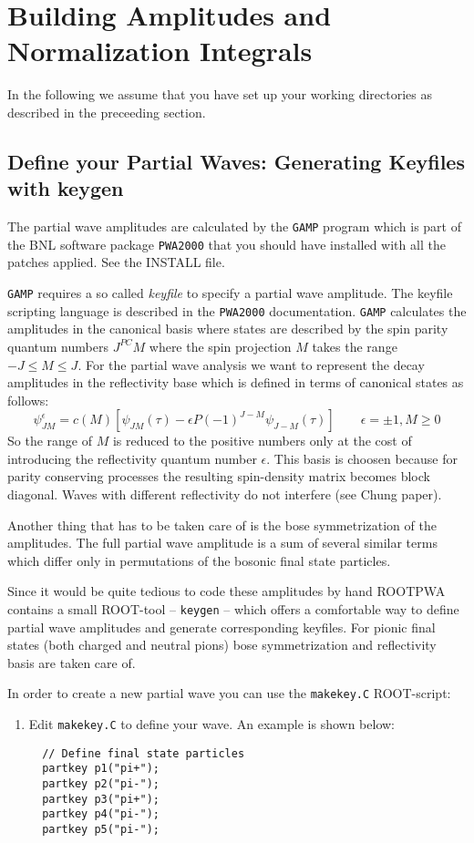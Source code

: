 \documentclass[12pt,a4paper]{article}
\begin{document}
{\section{Building Amplitudes and Normalization Integrals}
In the following we assume that you have set up your working directories as described in the preceeding section.

\subsection{Define your Partial Waves: Generating Keyfiles with keygen}
The partial wave amplitudes are calculated by the {\tt GAMP} program which is part of the BNL software package {\tt PWA2000} that you should have installed with all the patches applied. See the INSTALL file.

{\tt GAMP} requires a so called {\it keyfile} to specify a partial wave amplitude. The keyfile scripting language is described in the {\tt PWA2000} documentation. {\tt GAMP} calculates the amplitudes in the canonical basis where states are described by the spin parity quantum numbers $J^{PC}M$ where the spin projection $M$ takes the range $-J \leq M \leq J$. For the partial wave analysis we want to represent the decay amplitudes in the reflectivity base which is defined in terms of canonical states as follows:
\[\psi_{JM}^\epsilon = c(M)[\psi_{JM}(\tau)-\epsilon P(-1)^{J-M}\psi_{J-M}(\tau)]\quad\quad \epsilon=\pm1, M\geq0\]
So the range of $M$ is reduced to the positive numbers only at the cost of introducing the reflectivity quantum number $\epsilon$. This basis is choosen because for parity conserving processes the resulting spin-density matrix becomes block diagonal. Waves with different reflectivity do not interfere (see Chung paper).

Another thing that has to be taken care of is the bose symmetrization of the amplitudes. The full partial wave amplitude is a sum of several similar terms which differ only in permutations of the bosonic final state particles.

Since it would be quite tedious to code these amplitudes by hand ROOTPWA contains a small ROOT-tool -- {\tt keygen} -- which offers a comfortable way to define partial wave amplitudes and generate corresponding keyfiles. For pionic final states (both charged and neutral pions) bose symmetrization and reflectivity basis are taken care of.

In order to create a new partial wave you can use the {\tt makekey.C} ROOT-script:
\begin{enumerate}
\item Edit {\tt makekey.C} to define your wave. An example is shown below:
\begin{lstlisting}
  // Define final state particles
  partkey p1("pi+");
  partkey p2("pi-");
  partkey p3("pi+");
  partkey p4("pi-");
  partkey p5("pi-");


\end{lstlisting}
\end{enumerate}}
\end{document}
